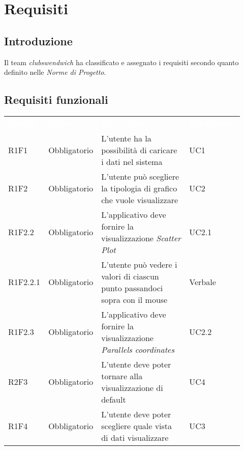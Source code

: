 \section{Requisiti}
\subsection{Introduzione}
Il team \textit{clubswendwich} ha classificato e assegnato i requisiti secondo quanto definito nelle \textit{Norme di Progetto}. 
\subsection{Requisiti funzionali}
{\renewcommand{\arraystretch}{1.5}
\begin{tabular}{p{0.12\linewidth}p{0.15\linewidth}p{0.50\linewidth}p{0.15\linewidth}}
	\rowcolor[RGB]{33, 73, 50}
	\textcolor{white}{\textbf{Codice}} & \textcolor{white}{\textbf{Classe}} & \textcolor{white}{\textbf{Descrizione}} &
    \textcolor{white}{\textbf{Riferimenti}}\\
    \rowcolor[RGB]{216, 235, 171}
    R1F1 & Obbligatorio & L'utente ha la possibilità di caricare i dati nel sistema & UC1\\
    \rowcolor[RGB]{233, 245, 206}
    R1F2 & Obbligatorio & L'utente può scegliere la tipologia di grafico che vuole visualizzare & UC2\\
    \rowcolor[RGB]{216, 235, 171}
    R1F2.2 & Obbligatorio & L'applicativo deve fornire la visualizzazione \textit{Scatter Plot} & UC2.1\\
    \rowcolor[RGB]{233, 245, 206}
    R1F2.2.1 & Obbligatorio & L'utente può vedere i valori di ciascun punto passandoci sopra con il mouse & Verbale\\
    \rowcolor[RGB]{216, 235, 171}
    R1F2.3 & Obbligatorio & L'applicativo deve fornire la visualizzazione \textit{Parallels coordinates} & UC2.2\\
    \rowcolor[RGB]{233, 245, 206}
    R2F3 & Obbligatorio & L'utente deve poter tornare alla visualizzazione di default & UC4\\
    \rowcolor[RGB]{216, 235, 171}
    R1F4 & Obbligatorio & L'utente deve poter scegliere quale vista di dati visualizzare & UC3\\
\end{tabular}	
}
